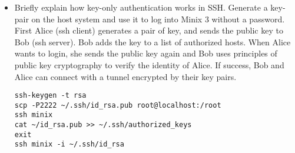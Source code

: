 \documentclass{article}
\begin{document}
\begin{itemize}
\item Briefly explain how key-only authentication works in SSH. Generate a key-pair on the host system and use it to log into Minix 3 without a password.\\[0.5em]
First Alice (ssh client) generates a pair of key, and sends the public key to Bob (ssh server). Bob adds the key to a list of authorized hosts. When Alice wants to login, she sends the public key again and Bob uses principles of public key cryptography to verify the identity of Alice. If success, Bob and Alice can connect with a tunnel encrypted by their key pairs.

\begin{verbatim}
ssh-keygen -t rsa
scp -P2222 ~/.ssh/id_rsa.pub root@localhost:/root
ssh minix
cat ~/id_rsa.pub >> ~/.ssh/authorized_keys
exit
ssh minix -i ~/.ssh/id_rsa
\end{verbatim}

\end{itemize}
\end{document}
